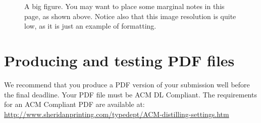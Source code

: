 \documentclass{sigchi-ext}
\begin{document}
\clearpage
\begin{figure}
\hspace*{-0.5\textwidth}%
\parbox{\textwidth}{
  \begin{center}
  \caption{A big figure. You may want to place some marginal notes in this page, as shown above. Notice also that this image resolution is quite low, as it is just an example of formatting.}
  \label{fig:bigsample}
  \end{center}  
}
\end{figure}



\section{Producing and testing PDF files}
We recommend that you produce a PDF version of your submission well before the final deadline. 
Your PDF file must be ACM DL Compliant. 
The requirements for an ACM Compliant PDF are available at:
\url{http://www.sheridanprinting.com/typedept/ACM-distilling-settings.htm}
\end{document}
